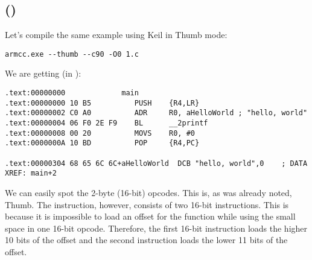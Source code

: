 \subsection{\NonOptimizingKeilVI (\ThumbMode)}

Let's compile the same example using Keil in Thumb mode:

\begin{lstlisting}
armcc.exe --thumb --c90 -O0 1.c 
\end{lstlisting}

We are getting (in \IDA):

\begin{lstlisting}[caption=\NonOptimizingKeilVI (\ThumbMode) + \IDA]
.text:00000000             main
.text:00000000 10 B5          PUSH    {R4,LR}
.text:00000002 C0 A0          ADR     R0, aHelloWorld ; "hello, world"
.text:00000004 06 F0 2E F9    BL      __2printf
.text:00000008 00 20          MOVS    R0, #0
.text:0000000A 10 BD          POP     {R4,PC}

.text:00000304 68 65 6C 6C+aHelloWorld  DCB "hello, world",0    ; DATA XREF: main+2
\end{lstlisting}

We can easily spot the 2-byte (16-bit) opcodes. This is, as was already noted, Thumb.
The  instruction, however, consists of two 16-bit instructions.
This is because it is impossible to load an offset for the \printf function while using the small space in one 16-bit opcode.
Therefore, the first 16-bit instruction loads the higher 10 bits of the offset and the second instruction loads 
the lower 11 bits of the offset.


